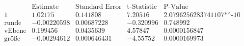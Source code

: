 \[\begin{array}{l|llll}
 \text{} & \text{Estimate} & \text{Standard Error} & \text{t-Statistic} & \text{P-Value} \\
\hline
 1 & 1.02175 & 0.141808 & 7.20516 & \text{2.0796256283741107$\grave{ }$*${}^{\wedge}$-10} \\
 \text{runde} & -0.00220598 & 0.00687228 & -0.320996 & 0.748992 \\
 \text{vEbene} & 0.199456 & 0.0435639 & 4.57847 & 0.0000156847 \\
 \text{gr{\" o}{\ss}e} & -0.00294612 & 0.000646431 & -4.55752 & 0.0000169973 \\
\end{array}\]

